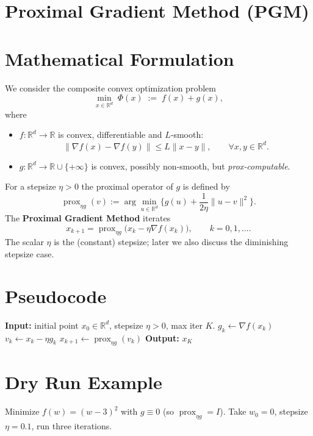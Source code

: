 \documentclass{article}
\newcommand{\prox}{\operatorname{prox}}
\newcommand{\grad}{\nabla}
\begin{document}
\section*{Proximal Gradient Method (PGM)}

\section*{Mathematical Formulation}
We consider the composite convex optimization problem  
\[
\min_{x\in\mathbb{R}^d}\; \Phi(x)\;:=\;f(x)+g(x),
\]
where  

\begin{itemize}[noitemsep]
    \item $f:\mathbb{R}^d\to\mathbb{R}$ is convex, differentiable and $L$‑smooth:
          \[
          \|\grad f(x)-\grad f(y)\|\le L\|x-y\|,\qquad\forall x,y\in\mathbb{R}^d .
          \]
    \item $g:\mathbb{R}^d\to\mathbb{R}\cup\{+\infty\}$ is convex, possibly non‑smooth, but \emph{prox‑computable}.
\end{itemize}
For a stepsize $\eta>0$ the proximal operator of $g$ is defined by
\[
\prox_{\eta g}(v):=\arg\min_{u\in\mathbb{R}^d}\Big\{ g(u)+\frac{1}{2\eta}\|u-v\|^2\Big\}.
\]
The \textbf{Proximal Gradient Method} iterates
\begin{equation}\label{eq:update}
x_{k+1}= \prox_{\eta g}\!\big(x_k-\eta\grad f(x_k)\big),\qquad k=0,1,\dots .
\end{equation}
The scalar $\eta$ is the (constant) stepsize; later we also discuss the diminishing stepsize case.

\section*{Pseudocode}
\begin{algorithm}[H]
\caption{Proximal Gradient Method}
\begin{algorithmic}[1]
\State \textbf{Input:} initial point $x_0\in\mathbb{R}^d$, stepsize $\eta>0$, max iter $K$.
    \State $g_k \gets \grad f(x_k)$ 
    \State $v_k \gets x_k-\eta g_k$ 
    \State $x_{k+1} \gets \prox_{\eta g}(v_k)$ 
\EndFor
\State \textbf{Output:} $x_K$
\end{algorithmic}
\end{algorithm}

\section*{Dry Run Example}
Minimize $f(w)=(w-3)^2$ with $g\equiv0$ (so $\prox_{\eta g}=I$).  
Take $w_0=0$, stepsize $\eta=0.1$, run three iterations.
\end{document}
